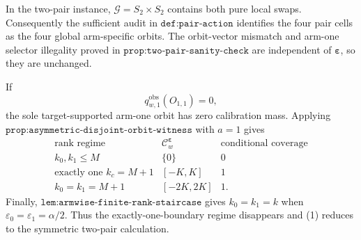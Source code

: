 In the two-pair instance, \(\mathcal G=S_2\times S_2\) contains both pure local swaps. Consequently the sufficient audit in \(\texttt{def:pair-action}\) identifies the four pair cells as the four global arm-specific orbits. The orbit-vector mismatch and arm-one selector illegality proved in \(\texttt{prop:two-pair-sanity-check}\) are independent of \(\boldsymbol\varepsilon\), so they are unchanged.

If
\[
q^{\mathrm{obs}}_{w,1}(O_{1,1})=0,
\]
the sole target-supported arm-one orbit has zero calibration mass. Applying \(\texttt{prop:asymmetric-disjoint-orbit-witness}\) with \(a=1\) gives
\[
\begin{array}{c|c|c}
\text{rank regime}
&
\mathcal C^{\boldsymbol\varepsilon}_w
&
\text{conditional coverage}
\\ \hline
k_0,k_1\le M&\{0\}&0\\
\text{exactly one }k_c=M+1&[-K,K]&1\\
k_0=k_1=M+1&[-2K,2K]&1.
\end{array}
\tag{1}
\]
Finally, \(\texttt{lem:armwise-finite-rank-staircase}\) gives \(k_0=k_1=k\) when \(\varepsilon_0=\varepsilon_1=\alpha/2\). Thus the exactly-one-boundary regime disappears and (1) reduces to the symmetric two-pair calculation.